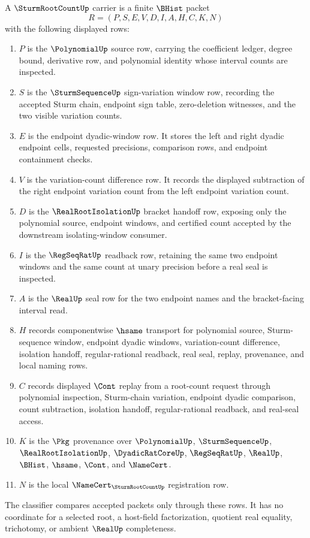 \begin{definition}
\label{def:sturm-root-count-carrier}
A $\SturmRootCountUp$ carrier is a finite $\BHist$ packet
$$
R=(P,S,E,V,D,I,A,H,C,K,N)
$$
with the following displayed rows:
\begin{enumerate}
\item $P$ is the $\PolynomialUp$ source row, carrying the coefficient ledger, degree bound, derivative row, and polynomial identity whose interval counts are inspected.
\item $S$ is the $\SturmSequenceUp$ sign-variation window row, recording the accepted Sturm chain, endpoint sign table, zero-deletion witnesses, and the two visible variation counts.
\item $E$ is the endpoint dyadic-window row. It stores the left and right dyadic endpoint cells, requested precisions, comparison rows, and endpoint containment checks.
\item $V$ is the variation-count difference row. It records the displayed subtraction of the right endpoint variation count from the left endpoint variation count.
\item $D$ is the $\RealRootIsolationUp$ bracket handoff row, exposing only the polynomial source, endpoint windows, and certified count accepted by the downstream isolating-window consumer.
\item $I$ is the $\RegSeqRatUp$ readback row, retaining the same two endpoint windows and the same count at unary precision before a real seal is inspected.
\item $A$ is the $\RealUp$ seal row for the two endpoint names and the bracket-facing interval read.
\item $H$ records componentwise $\hsame$ transport for polynomial source, Sturm-sequence window, endpoint dyadic windows, variation-count difference, isolation handoff, regular-rational readback, real seal, replay, provenance, and local naming rows.
\item $C$ records displayed $\Cont$ replay from a root-count request through polynomial inspection, Sturm-chain variation, endpoint dyadic comparison, count subtraction, isolation handoff, regular-rational readback, and real-seal access.
\item $K$ is the $\Pkg$ provenance over $\PolynomialUp$, $\SturmSequenceUp$, $\RealRootIsolationUp$, $\DyadicRatCoreUp$, $\RegSeqRatUp$, $\RealUp$, $\BHist$, $\hsame$, $\Cont$, and $\NameCert$.
\item $N$ is the local $\NameCert_{\SturmRootCountUp}$ registration row.
\end{enumerate}
The classifier compares accepted packets only through these rows. It has no coordinate for a selected root, a host-field factorization, quotient real equality, trichotomy, or ambient $\RealUp$ completeness.
\end{definition}

